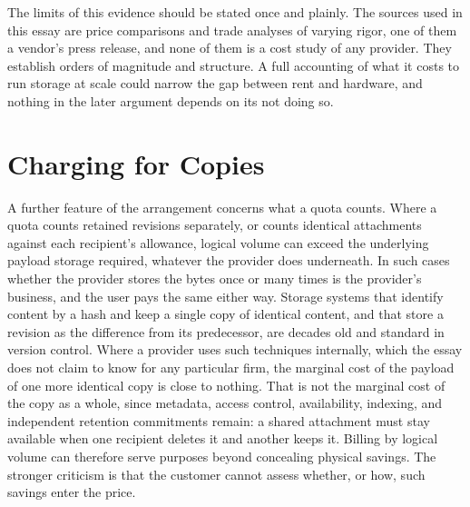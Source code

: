 \documentclass[12pt]{article}
\begin{document}
The limits of this evidence should be stated once and plainly. The sources used in this essay are price comparisons and trade analyses of varying rigor, one of them a vendor's press release, and none of them is a cost study of any provider. They establish orders of magnitude and structure. A full accounting of what it costs to run storage at scale could narrow the gap between rent and hardware, and nothing in the later argument depends on its not doing so.

\section{Charging for Copies}

A further feature of the arrangement concerns what a quota counts. Where a quota counts retained revisions separately, or counts identical attachments against each recipient's allowance, logical volume can exceed the underlying payload storage required, whatever the provider does underneath. In such cases whether the provider stores the bytes once or many times is the provider's business, and the user pays the same either way. Storage systems that identify content by a hash and keep a single copy of identical content, and that store a revision as the difference from its predecessor, are decades old and standard in version control. Where a provider uses such techniques internally, which the essay does not claim to know for any particular firm, the marginal cost of the payload of one more identical copy is close to nothing. That is not the marginal cost of the copy as a whole, since metadata, access control, availability, indexing, and independent retention commitments remain: a shared attachment must stay available when one recipient deletes it and another keeps it. Billing by logical volume can therefore serve purposes beyond concealing physical savings. The stronger criticism is that the customer cannot assess whether, or how, such savings enter the price.
\end{document}

